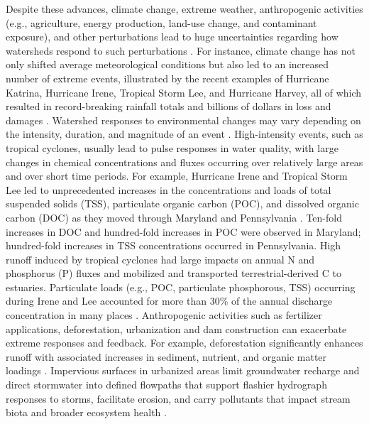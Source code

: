\documentclass[preprint,review, 12pt]{elsarticle}
\begin{document}
Despite these advances, climate change, extreme weather, anthropogenic activities (e.g., agriculture, energy production, land-use change, and contaminant exposure), and other perturbations lead to huge uncertainties regarding how watersheds respond to such perturbations \citep{Page2012}. For instance, climate change has not only shifted average meteorological conditions but also led to an increased number of extreme events, illustrated by the recent examples of Hurricane Katrina, Hurricane Irene, Tropical Storm Lee, and Hurricane Harvey, all of which resulted in record-breaking rainfall totals and billions of dollars in loss and damages \citep{Vidon2018, Paerl2018b}. Watershed responses to environmental changes may vary depending on the intensity, duration, and magnitude of an event \citep{Kaushal2018g}. High-intensity events, such as tropical cyclones, usually lead to pulse responses in water quality, with large changes in chemical concentrations and fluxes occurring over relatively large areas and over short time periods. For example, Hurricane Irene and Tropical Storm Lee led to unprecedented increases in the concentrations and loads of total suspended solids (TSS), particulate organic carbon (POC), and dissolved organic carbon (DOC) as they moved through Maryland and Pennsylvania \citep{Vidon2018}. Ten-fold increases in DOC and hundred-fold increases in POC were observed in Maryland; hundred-fold increases in TSS concentrations occurred in Pennsylvania. High runoff induced by tropical cyclones had large impacts on annual N and phosphorus (P) fluxes and mobilized and transported terrestrial-derived C to estuaries. Particulate loads (e.g., POC, particulate phosphorous, TSS) occurring during Irene and Lee accounted for more than 30\% of the annual discharge concentration in many places \citep{Paerl2018b}. Anthropogenic activities such as fertilizer applications, deforestation, urbanization and dam construction can exacerbate extreme responses and feedback. For example, deforestation significantly enhances runoff with associated increases in sediment, nutrient, and organic matter loadings \citep{Heaney1984, Hawley2016, Paul2001}. Impervious surfaces in urbanized areas limit groundwater recharge and direct stormwater into defined flowpaths that support flashier hydrograph responses to storms, facilitate erosion, and carry pollutants that impact stream biota and broader ecosystem health \citep{Walsh2005, Walsh2007, Burns2012, Herlihy1998, Grimm2005, Kaye2006, Tsoi2011,Fletcher2013Emily}. 
\end{document}
